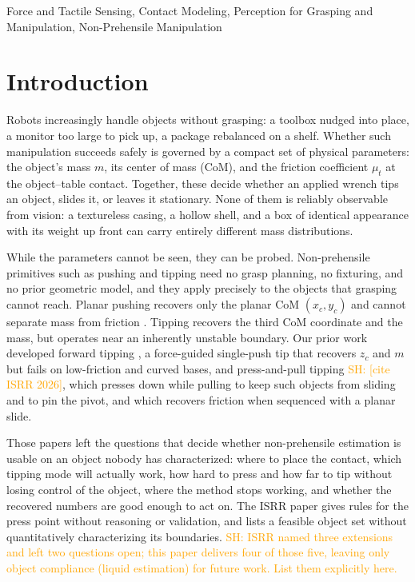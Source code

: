 \documentclass[10pt, conference]{IEEEtran}
\newcommand{\sh}[1]{\textcolor{orange}{SH: #1}}
\newcommand{\isrr}{\sh{[cite ISRR 2026]}}
\newcommand{\iros}{\cite{hyland_before_2026}}
\begin{document}
\begin{IEEEkeywords}
Force and Tactile Sensing, Contact Modeling, Perception for Grasping and Manipulation, Non-Prehensile Manipulation
\end{IEEEkeywords}

\IEEEpeerreviewmaketitle

\section{Introduction} \label{sec:intro}

Robots increasingly handle objects without grasping: a toolbox nudged into place, a monitor too large to pick up, a package rebalanced on a shelf. Whether such manipulation succeeds safely is governed by a compact set of physical parameters: the object's mass $m$, its center of mass (CoM), and the friction coefficient $\mu_t$ at the object--table contact. Together, these decide whether an applied wrench tips an object, slides it, or leaves it stationary. None of them is reliably observable from vision: a textureless casing, a hollow shell, and a box of identical appearance with its weight up front can carry entirely different mass distributions.

While the parameters cannot be seen, they can be probed. Non-prehensile primitives such as pushing and tipping need no grasp planning, no fixturing, and no prior geometric model, and they apply precisely to the objects that grasping cannot reach. Planar pushing recovers only the planar CoM $(x_c, y_c)$ and cannot separate mass from friction \cite{mason_mechanics_1986, bauza_probabilistic_2017, hyland_predicting_2023}. Tipping recovers the third CoM coordinate and the mass, but operates near an inherently unstable boundary. Our prior work developed forward tipping \iros{}, a force-guided single-push tip that recovers $z_c$ and $m$ but fails on low-friction and curved bases, and press-and-pull tipping \isrr{}, which presses down while pulling to keep such objects from sliding and to pin the pivot, and which recovers friction when sequenced with a planar slide.

Those papers left the questions that decide whether non-prehensile estimation is usable on an object nobody has characterized: where to place the contact, which tipping mode will actually work, how hard to press and how far to tip without losing control of the object, where the method stops working, and whether the recovered numbers are good enough to act on. The ISRR paper gives rules for the press point without reasoning or validation, and lists a feasible object set without quantitatively characterizing its boundaries. \sh{ISRR named three extensions and left two questions open; this paper delivers four of those five, leaving only object compliance (liquid estimation) for future work. List them explicitly here.}
\end{document}
